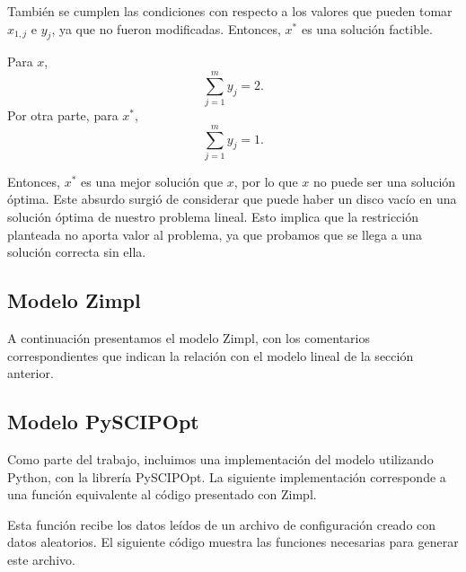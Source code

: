 \documentclass[11pt, a4paper, pdftex]{article}
\begin{document}
También se cumplen las condiciones con respecto a los valores que pueden
tomar $x_{1, j}$ e $y_{j}$, ya que no fueron modificadas. Entonces,
$x^{*}$ es una solución factible.

Para $x$,
\begin{displaymath}
	\sum_{j = 1}^{m} y_{j} = 2.
\end{displaymath}
Por otra parte, para $x^{*}$,
\begin{displaymath}
	\sum_{j = 1}^{m} y_{j} = 1.
\end{displaymath}

Entonces, $x^{*}$ es una mejor solución que $x$, por lo que $x$ no puede
ser una solución óptima. Este absurdo surgió de considerar que puede
haber un disco vacío en una solución óptima de nuestro problema lineal.
Esto implica que la restricción planteada no aporta valor al problema,
ya que probamos que se llega a una solución correcta sin ella.

\newpage

\subsection{Modelo Zimpl}

A continuación presentamos el modelo Zimpl, con los comentarios
correspondientes que indican la relación con el modelo lineal de la sección
anterior.



\newpage
\subsection{Modelo PySCIPOpt}

Como parte del trabajo, incluimos una implementación del modelo utilizando
Python, con la librería PySCIPOpt. La siguiente implementación corresponde 
a una función equivalente al código presentado con Zimpl.



\newpage

Esta función recibe los datos leídos de un archivo de configuración creado 
con datos aleatorios. El siguiente código muestra las funciones necesarias para generar este archivo.



\newpage
\end{document}
